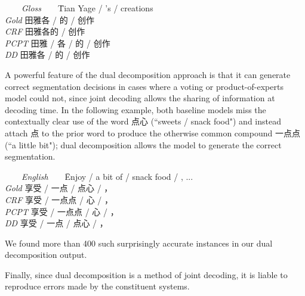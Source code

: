 \begin{small}
\begin{tabbing}
\ \ \ \ \= \emph{Gloss}\ \ \ \ \= Tian Yage / 's / creations \\
\> \emph{Gold} \>   田雅各 / 的 / 创作 \\
\> \emph{CRF} \>  田雅各的 / 创作 \\
\> \emph{PCPT} \>  田雅 / 各 / 的 / 创作 \\
\> \emph{DD} \>  田雅各 / 的 / 创作 \\
\end{tabbing}
\end{small}

A powerful feature of the dual decomposition approach is that it can generate correct segmentation decisions in cases where a voting or product-of-experts model could not, since joint decoding allows the sharing of information at decoding time. In the following example, both baseline models miss the contextually clear use of the word 点心 (``sweets / snack food") and instead attach 点 to the prior word to produce the otherwise common compound 一点点 (``a little bit"); dual decomposition allows the model to generate the correct segmentation.
\begin{small}
\begin{tabbing}
\ \ \ \ \= \emph{English}\ \ \ \ \= Enjoy / a bit of / snack food / , ... \\
\> \emph{Gold} \>  享受 / 一点 / 点心 /  ，\\
\> \emph{CRF} \> 享受 / 一点点 / 心 / ，\\
\> \emph{PCPT} \> 享受 / 一点点 / 心 / ， \\
\> \emph{DD} \>  享受 / 一点 / 点心 / ，\\
\end{tabbing}
\end{small}
We found more than 400 such surprisingly accurate instances in our dual decomposition output.

Finally, since dual decomposition is a method of joint decoding, it is liable to reproduce errors made by the constituent systems. 


